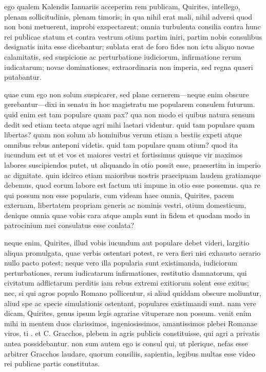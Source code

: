  ego qualem Kalendis Ianuariis acceperim rem publicam, Quirites, intellego, plenam sollicitudinis, plenam timoris; in qua nihil erat mali, nihil adversi quod non boni metuerent, improbi exspectarent; omnia turbulenta consilia contra hunc rei publicae statum et contra vestrum otium partim iniri, partim nobis consulibus designatis inita esse dicebantur; sublata erat de foro fides non ictu aliquo novae calamitatis, sed suspicione ac perturbatione iudiciorum, infirmatione rerum iudicatarum; novae dominationes, extraordinaria non imperia, sed regna quaeri putabantur.

 quae cum ego non solum suspicarer, sed plane cernerem—neque enim obscure gerebantur—dixi in senatu in hoc magistratu me popularem consulem futurum. quid enim est tam populare quam pax? qua non modo ei quibus natura sensum dedit sed etiam tecta atque agri mihi laetari videntur. quid tam populare quam libertas? quam non solum ab hominibus verum etiam a bestiis expeti atque omnibus rebus anteponi videtis. quid tam populare quam otium? quod ita iucundum est ut et vos et maiores vestri et fortissimus quisque vir maximos labores suscipiendos putet, ut aliquando in otio possit esse, praesertim in imperio ac dignitate. quin idcirco etiam maioribus nostris praecipuam laudem gratiamque debemus, quod eorum labore est factum uti impune in otio esse possemus. qua re qui possum non esse popularis, cum videam haec omnia, Quirites, pacem externam, libertatem propriam generis ac nominis vestri, otium domesticum, denique omnia quae vobis cara atque ampla sunt in fidem et quodam modo in patrocinium mei consulatus esse conlata?

 neque enim, Quirites, illud vobis iucundum aut populare debet videri, largitio aliqua promulgata, quae verbis ostentari potest, re vera fieri nisi exhausto aerario nullo pacto potest; neque vero illa popularia sunt existimanda, iudiciorum perturbationes, rerum iudicatarum infirmationes, restitutio damnatorum, qui civitatum adflictarum perditis iam rebus extremi exitiorum solent esse exitus; nec, si qui agros populo Romano pollicentur, si aliud quiddam obscure moliuntur, aliud spe ac specie simulationis ostentant, populares existimandi sunt. nam vere dicam, Quirites, genus ipsum legis agrariae vituperare non possum. venit enim mihi in mentem duos clarissimos, ingeniosissimos, amantissimos plebei Romanae viros, ti . et C. Gracchos, plebem in agris publicis constituisse, qui agri a privatis antea possidebantur. non sum autem ego is consul qui, ut plerique, nefas esse arbitrer Gracchos laudare, quorum consiliis, sapientia, legibus multas esse video rei publicae partis constitutas.

